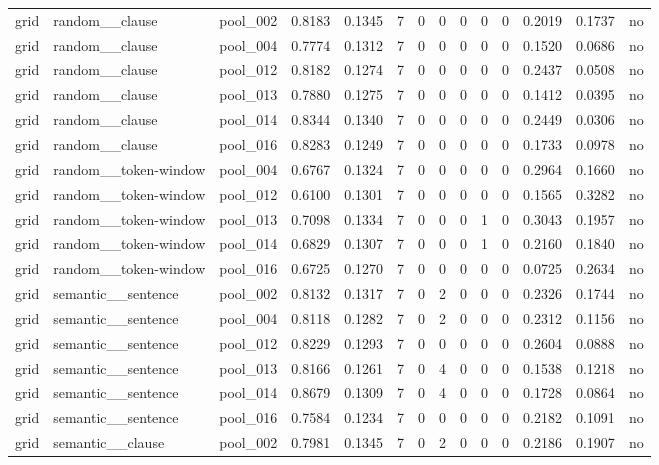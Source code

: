 \begin{table}[t]
{\begin{tabular}{llllllllllllll}
grid & random\_\_clause & pool\_002 & 0.8183 & 0.1345 & 7 & 0 & 0 & 0 & 0 & 0 & 0.2019 & 0.1737 & no \\
grid & random\_\_clause & pool\_004 & 0.7774 & 0.1312 & 7 & 0 & 0 & 0 & 0 & 0 & 0.1520 & 0.0686 & no \\
grid & random\_\_clause & pool\_012 & 0.8182 & 0.1274 & 7 & 0 & 0 & 0 & 0 & 0 & 0.2437 & 0.0508 & no \\
grid & random\_\_clause & pool\_013 & 0.7880 & 0.1275 & 7 & 0 & 0 & 0 & 0 & 0 & 0.1412 & 0.0395 & no \\
grid & random\_\_clause & pool\_014 & 0.8344 & 0.1340 & 7 & 0 & 0 & 0 & 0 & 0 & 0.2449 & 0.0306 & no \\
grid & random\_\_clause & pool\_016 & 0.8283 & 0.1249 & 7 & 0 & 0 & 0 & 0 & 0 & 0.1733 & 0.0978 & no \\
grid & random\_\_token-window & pool\_004 & 0.6767 & 0.1324 & 7 & 0 & 0 & 0 & 0 & 0 & 0.2964 & 0.1660 & no \\
grid & random\_\_token-window & pool\_012 & 0.6100 & 0.1301 & 7 & 0 & 0 & 0 & 0 & 0 & 0.1565 & 0.3282 & no \\
grid & random\_\_token-window & pool\_013 & 0.7098 & 0.1334 & 7 & 0 & 0 & 0 & 1 & 0 & 0.3043 & 0.1957 & no \\
grid & random\_\_token-window & pool\_014 & 0.6829 & 0.1307 & 7 & 0 & 0 & 0 & 1 & 0 & 0.2160 & 0.1840 & no \\
grid & random\_\_token-window & pool\_016 & 0.6725 & 0.1270 & 7 & 0 & 0 & 0 & 0 & 0 & 0.0725 & 0.2634 & no \\
grid & semantic\_\_sentence & pool\_002 & 0.8132 & 0.1317 & 7 & 0 & 2 & 0 & 0 & 0 & 0.2326 & 0.1744 & no \\
grid & semantic\_\_sentence & pool\_004 & 0.8118 & 0.1282 & 7 & 0 & 2 & 0 & 0 & 0 & 0.2312 & 0.1156 & no \\
grid & semantic\_\_sentence & pool\_012 & 0.8229 & 0.1293 & 7 & 0 & 0 & 0 & 0 & 0 & 0.2604 & 0.0888 & no \\
grid & semantic\_\_sentence & pool\_013 & 0.8166 & 0.1261 & 7 & 0 & 4 & 0 & 0 & 0 & 0.1538 & 0.1218 & no \\
grid & semantic\_\_sentence & pool\_014 & 0.8679 & 0.1309 & 7 & 0 & 4 & 0 & 0 & 0 & 0.1728 & 0.0864 & no \\
grid & semantic\_\_sentence & pool\_016 & 0.7584 & 0.1234 & 7 & 0 & 0 & 0 & 0 & 0 & 0.2182 & 0.1091 & no \\
grid & semantic\_\_clause & pool\_002 & 0.7981 & 0.1345 & 7 & 0 & 2 & 0 & 0 & 0 & 0.2186 & 0.1907 & no \\

\end{tabular}}
\end{table}
